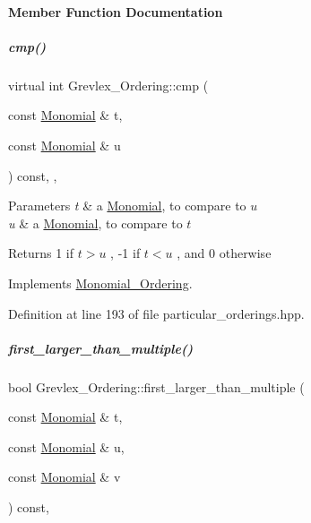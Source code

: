 \paragraph{Member Function Documentation}
\mbox{\label{group__orderinggroup_a1b668700d9ccc218ebae6049bb76fb07}} 
\subparagraph{\texorpdfstring{cmp()}{cmp()}}
{\footnotesize\ttfamily virtual int Grevlex\+\_\+\+Ordering\+::cmp (\begin{DoxyParamCaption}\item[{const \hyperlink{group__polygroup_class_monomial}{Monomial} \&}]{t,  }\item[{const \hyperlink{group__polygroup_class_monomial}{Monomial} \&}]{u }\end{DoxyParamCaption}) const\hspace{0.3cm}{\ttfamily [inline]}, {\ttfamily [override]}, {\ttfamily [virtual]}}


\begin{DoxyParams}{Parameters}
{\em t} & a \hyperlink{group__polygroup_class_monomial}{Monomial}, to compare to $ u $ \\
\hline
{\em u} & a \hyperlink{group__polygroup_class_monomial}{Monomial}, to compare to $ t $ \\
\hline
\end{DoxyParams}
\begin{DoxyReturn}{Returns}
1 if $ t > u $ , -\/1 if $ t < u $ , and 0 otherwise 
\end{DoxyReturn}


Implements \hyperlink{group__orderinggroup_a9bc3155fc98b4d40c26118fa2114b827}{Monomial\+\_\+\+Ordering}.



Definition at line 193 of file particular\+\_\+orderings.\+hpp.

\mbox{\label{group__orderinggroup_a4f8a9207711dabeb940fba0e32f4ab1f}} 
\subparagraph{\texorpdfstring{first\+\_\+larger\+\_\+than\+\_\+multiple()}{first\_larger\_than\_multiple()}}
{\footnotesize\ttfamily bool Grevlex\+\_\+\+Ordering\+::first\+\_\+larger\+\_\+than\+\_\+multiple (\begin{DoxyParamCaption}\item[{const \hyperlink{group__polygroup_class_monomial}{Monomial} \&}]{t,  }\item[{const \hyperlink{group__polygroup_class_monomial}{Monomial} \&}]{u,  }\item[{const \hyperlink{group__polygroup_class_monomial}{Monomial} \&}]{v }\end{DoxyParamCaption}) const\hspace{0.3cm}{\ttfamily [override]}, {\ttfamily [virtual]}}


